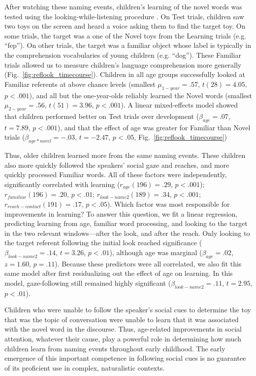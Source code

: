 \documentclass{pnastwo}
\begin{document}
\begin{article}
After watching these naming events, children's learning of the novel words was tested using the looking-while-listening procedure \citep{fernald1998, fernald2008}. On Test trials, children saw two toys on the screen and heard a voice asking them to find the target toy. On some trials, the target was a one of the Novel toys from the Learning trials (e.g. ``fep''). On other trials, the target was a familiar object whose label is typically in the comprehension vocabularies of young children (e.g. ``dog''). These Familiar trials allowed us to measure children's language comprehension more generally (Fig.~\ref{fig:reflook_timecourse}). Children in all age groups successfully looked at Familiar referents at above chance levels (smallest $\mu_{1-year} = .57$, $t(28) = 4.05$, $p < .001$), and all but the one-year-olds reliably learned the Novel words (smallest $\mu_{2-year} = .56$, $t(51) = 3.96$, $p < .001$). A linear mixed-effects model showed that children performed better on Test trials over development ($\beta_{age} = .07$, $t = 7.89$, $p < .001$), and that the effect of age was greater for Familiar than Novel trials ($\beta_{age * novel} = -.03$, $t = -2.47$, $p < .05$, Fig.~\ref{fig:reflook_timecourse})

Thus, older children learned more from the same naming events. These children also more quickly followed the speakers' social gaze and reaches, and more quickly processed Familiar words. All of these factors were independently, significantly correlated with learning ($r_{age}(196) = .29$, $p < .001$); $r_{familiar}(196) = .20$, $p < .01$; $r_{look-name2}(189) = .34$, $p < .001$; $r_{reach-contact}(191) = .17$, $p < .05$). Which factor was most responsible for improvements in learning? To answer this question, we fit a linear regression, predicting learning from age, familiar word processing, and looking to the target in the two relevant windows---after the look, and after the reach. Only looking to the target referent following the initial look reached significance ($\beta_{look-name2} = .14$, $t = 3.26$, $p < .01$), although age was marginal ($\beta_{age} = .02$, $z = 1.60$, $p = .11$). Because these predictors were all correlated, we also fit this same model after first residualizing out the effect of age on learning. In this model, gaze-following still remained highly significant ($\beta_{look-name2} = .11$, $t = 2.95$, $p < .01$).

Children who were unable to follow the speaker's social cues to determine the toy that was the topic of conversation were unable to learn that it was associated with the novel word in the discourse. Thus, age-related improvements in social attention, whatever their cause, play a powerful role in determining how much children learn from naming events throughout early childhood. The early emergence of this important competence in following social cues is no guarantee of its proficient use in complex, naturalistic contexts.


\end{article}
\end{document}

